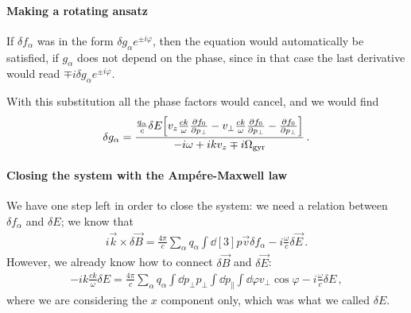 \documentclass[main.tex]{subfiles}
\begin{document}
\paragraph{Making a rotating ansatz}

If \(\delta f_\alpha \) was in the form \(\delta g_\alpha e^{\pm i \varphi }\), then the equation would automatically be satisfied, if \(g_\alpha \) does not depend on the phase, since in that case the last derivative would read \(\mp i \delta g_\alpha e^{\pm i \varphi }\). 

With this substitution all the phase factors would cancel, and we would find 
%
\begin{align}
\delta g_\alpha = \frac{\frac{q_\alpha}{c} \delta E \qty[v_z \frac{ck}{\omega } \pdv{f_0 }{p_\perp} - v_\perp \frac{ck}{\omega } \pdv{f_0 }{p_\perp} - \pdv{f_0 }{p_\perp}]}{- i \omega + i k v_z \mp i \Omega _{\text{gyr}}}
\,.
\end{align}

\paragraph{Closing the system with the Ampére-Maxwell law}

We have one step left in order to close the system: 
we need a relation between \(\delta f_\alpha \) and \(\delta E\); we know that 
%
\begin{align}
i \vec{k} \times \delta \vec{B} = \frac{4 \pi }{c} \sum _{\alpha } q_\alpha \int \dd[3]{p } \vec{v} \delta f_\alpha 
- i \frac{\omega}{c} \delta \vec{E}
\,.
\end{align}
%
However, we already know how to connect \(\delta \vec{B}\) and \(\delta \vec{E}\): 
%
\begin{align}
- i k \frac{ck}{\omega } \delta E = 
\frac{4 \pi }{c} \sum _{\alpha } q_\alpha \int \dd{p_\perp} p_\perp \int \dd{p_\parallel} \int \dd{\varphi } v_\perp \cos \varphi 
- i \frac{\omega}{c} \delta E
\,,
\end{align}
%
where we are considering the \(x\) component only, which was what we called \(\delta E\). 
\end{document}
